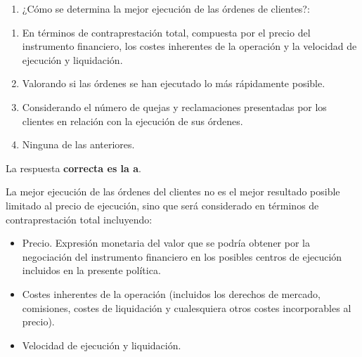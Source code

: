 \documentclass[
  letterpaper,
  DIV=11,
  numbers=noendperiod]{scrreprt}
\providecommand{\tightlist}{%
  \setlength{\itemsep}{0pt}\setlength{\parskip}{0pt}}\usepackage{longtable,booktabs,array}
\begin{document}
\begin{enumerate}
\def\labelenumi{\arabic{enumi}.}
\setcounter{enumi}{52}
\tightlist
\item
  ¿Cómo se determina la mejor ejecución de las órdenes de clientes?:
\end{enumerate}

\begin{enumerate}
\def\labelenumi{\alph{enumi})}
\item
  En términos de contraprestación total, compuesta por el precio del
  instrumento financiero, los costes inherentes de la operación y la
  velocidad de ejecución y liquidación.
\item
  Valorando si las órdenes se han ejecutado lo más rápidamente posible.
\item
  Considerando el número de quejas y reclamaciones presentadas por los
  clientes en relación con la ejecución de sus órdenes.
\item
  Ninguna de las anteriores.
\end{enumerate}

\begin{tcolorbox}[enhanced jigsaw, left=2mm, opacityback=0, colback=white, breakable, arc=.35mm, bottomrule=.15mm, rightrule=.15mm, toprule=.15mm, leftrule=.75mm, colframe=quarto-callout-tip-color-frame]
\begin{minipage}[t]{5.5mm}
\textcolor{quarto-callout-tip-color}{\faLightbulb}
\end{minipage}%
\begin{minipage}[t]{\textwidth - 5.5mm}

La respuesta \textbf{correcta es la a}.

La mejor ejecución de las órdenes del clientes no es el mejor resultado
posible limitado al precio de ejecución, sino que será considerado en
términos de contraprestación total incluyendo:

\begin{itemize}
\item
  Precio. Expresión monetaria del valor que se podría obtener por la
  negociación del instrumento financiero en los posibles centros de
  ejecución incluidos en la presente política.
\item
  Costes inherentes de la operación (incluidos los derechos de mercado,
  comisiones, costes de liquidación y cualesquiera otros costes
  incorporables al precio).
\item
  Velocidad de ejecución y liquidación.
\end{itemize}

\end{minipage}%
\end{tcolorbox}
\end{document}
